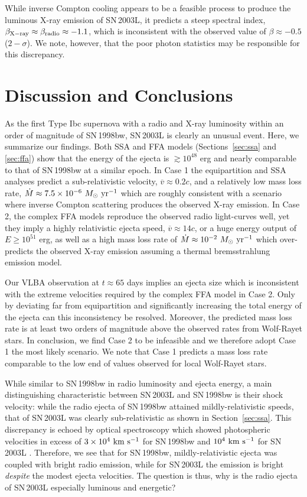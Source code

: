 \documentclass[12pt,preprint]{aastex}
\begin{document}
While inverse Compton cooling appears to be a feasible process to
produce the luminous X-ray emission of SN\,2003L, it predicts a
steep spectral index, $\beta_{\rm X-ray}\approx \beta_{\rm
radio}\approx -1.1$, which is inconsistent with the observed value of
$\beta\approx -0.5$ ($2-\sigma$).  We note, however, that the poor photon
statistics may be responsible for this discrepancy.

\section{Discussion and Conclusions}
\label{sec:disc}
As the first Type Ibc supernova with a radio and X-ray luminosity
within an order of magnitude of SN\,1998bw, SN\,2003L is clearly an
unusual event.  Here, we summarize our findings.  Both SSA and FFA models
(Sections~\ref{sec:ssa} and \ref{sec:ffa}) show that the energy of the
ejecta is $\gtrsim 10^{48}$ erg and nearly comparable to that of
SN\,1998bw at a similar epoch.  In Case 1 the equipartition and SSA
analyses predict a sub-relativistic velocity, $\overline{v}\approx 0.2c$,
and a relatively low mass loss rate, $\dot{M}\approx 7.5\times
10^{-6}~M_{\odot}~\rm yr^{-1}$ which are roughly consistent with a
scenario where inverse Compton scattering produces the observed X-ray
emission.  In Case 2, the complex FFA models reproduce the observed radio
light-curves well, yet they imply a highly relativistic ejecta
speed, $\overline{v}\approx 14c$, or a huge energy output of $E\ge
10^{51}$ erg, as well as a high mass loss rate of $\dot{M}\approx
10^{-2}~M_{\odot}~\rm yr^{-1}$ which over-predicts the observed 
X-ray emission assuming a thermal bremsstrahlung emission model.

Our VLBA observation at $t\approx 65$ days implies an ejecta size
which is inconsistent with the extreme velocities required by the
complex FFA model in Case 2. Only by deviating far from equipartition and
significantly increasing the total energy of the ejecta can this
inconsistency be resolved.  Moreover, the predicted mass loss rate is
at least two orders of magnitude above the observed rates from
Wolf-Rayet stars.  In conclusion, we find Case 2 to be infeasible and
we therefore adopt Case 1 the most likely scenario. We note that Case 1
predicts a mass loss rate comparable to the low end of values observed
for local Wolf-Rayet stars.

While similar to SN\,1998bw in radio luminosity and ejecta energy, a
main distinguishing characteristic between SN\,2003L and SN\,1998bw is
their shock velocity: while the radio ejecta of SN\,1998bw attained
mildly-relativistic speeds, that of SN\,2003L was clearly
sub-relativistic as shown in Section~\ref{sec:ssa}.  This discrepancy
is echoed by optical spectroscopy which showed photospheric velocities
in excess of $3\times 10^4~\rm km~s^{-1}$ for SN\,1998bw
\citep{pcd+01} and $10^{4}~\rm km~s^{-1}$ for SN\,2003L
\citep{vcd+03,mck+03,skg+04}.  Therefore, we see that for SN\,1998bw,
mildly-relativistic ejecta was coupled with bright radio emission,
while for SN\,2003L the emission is bright {\it despite} the modest
ejecta velocities.  The question is thus, why is the radio ejecta of
SN\,2003L especially luminous and energetic?
\end{document}

